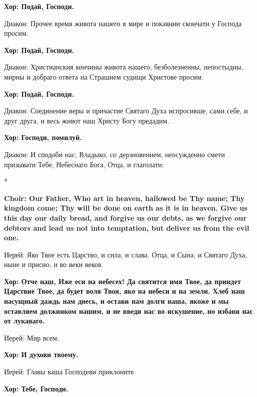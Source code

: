 \documentclass[12pt,a4paper,titlepage]{report}
\begin{document}
\begin{paracol}[1]{2}
  \textbf{Хор: Подай, Господи.}

  Диакон:	Прочее время живота нашего в мире и покаянии скончати у Господа просим.

  \textbf{Хор: Подай, Господи.}

  Диакон:	Христианския кончины живота нашего, безболезненны, непостыдны, мирны и добраго ответа на Страшнем судищи Христове просим.

  \textbf{Хор: Подай, Господи.}

  Диакон:	Соединение веры и причастие Святаго Духа испросивше, сами себе, и друг друга, и весь живот наш Христу Богу предадим.

  \textbf{Хор: Господи, помилуй.}

  Диакон: 	И сподоби нас, Владыко, со дерзновением, неосужденно смети призывати Тебе, Небеснаго Бога, Отца, и глаголати:

  \switchcolumn[0]*

  \textbf{Choir: Our Father, Who art in heaven, hallowed be Thy name; Thy kingdom come; Thy will be done on earth as it is in heaven. Give us this day our daily bread, and forgive us our debts, as we forgive our debtors and lead us not into temptation, but deliver us from the evil one.}

  \switchcolumn[1]


  Иерей: Яко Твое есть Царство, и сила, и слава. Отца, и Сына, и Святаго Духа, ныне и присно, и во веки веков.

  \textbf{Хор: Отче наш, Иже еси на небесех! Да святится имя Твое, да приидет Царствие Твое, да будет воля Твоя, яко на небеси и на земли. Хлеб наш насущный даждь нам днесь, и остави нам долги наша, якоже и мы оставляем должником нашим, и не введи нас во искушение, но избави нас от лукаваго.}

  Иерей: Мир всем.

  \textbf{Хор: И духови твоему.}

  Иерей: Главы ваша Господеви приклоните.

  \textbf{Хор: Тебе, Господи.}


\end{paracol}
\end{document}
